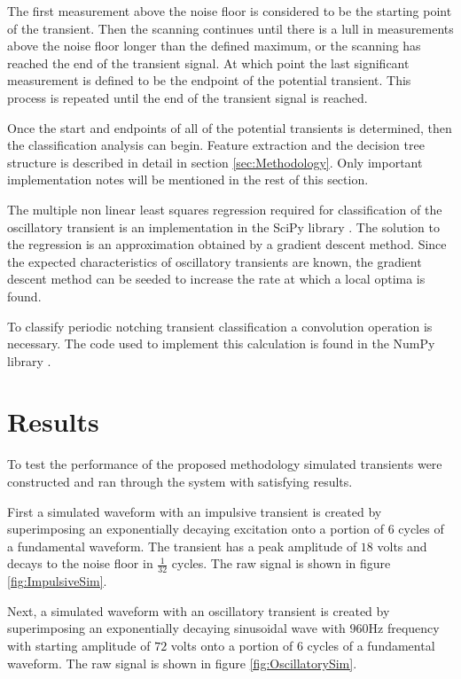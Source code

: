 \documentclass[10pt,conference,compsocconf]{IEEEtran}
\begin{document}
The first measurement above the noise floor is considered to be the starting point of the transient. Then the scanning continues until there is a lull in measurements above the noise floor longer than the defined maximum, or the scanning has reached the end of the transient signal. At which point the last significant measurement is defined to be the endpoint of the potential transient. This process is repeated until the end of the transient signal is reached.

Once the start and endpoints of all of the potential transients is determined, then the classification analysis can begin. Feature extraction and the decision tree structure is described in detail in section \ref{sec:Methodology}. Only important implementation notes will be mentioned in the rest of this section.

The multiple non linear least squares regression required for classification of the oscillatory transient is an implementation in the SciPy library \cite{scipy:2019}. The solution to the regression is an approximation obtained by a gradient descent method. Since the expected characteristics of oscillatory transients are known, the gradient descent method can be seeded to increase the rate at which a local optima is found.

To classify periodic notching transient classification a convolution operation is necessary. The code used to implement this calculation is found in the NumPy library \cite{numpy}. 

\section{Results}
\label{sec:Results}
To test the performance of the proposed methodology simulated transients were constructed and ran through the system with satisfying results. 

First a simulated waveform with an impulsive transient is created by superimposing an exponentially decaying excitation onto a portion of $6$ cycles of a fundamental waveform. The transient has a peak amplitude of $18$ volts and decays to the noise floor in $\frac{1}{32}$ cycles. The raw signal is shown in figure \ref{fig:ImpulsiveSim}.

Next, a simulated waveform with an oscillatory transient is created by superimposing an exponentially decaying sinusoidal wave with $960$Hz frequency with starting amplitude of $72$ volts onto a portion of $6$ cycles of a fundamental waveform. The raw signal is shown in figure \ref{fig:OscillatorySim}.
\end{document}
